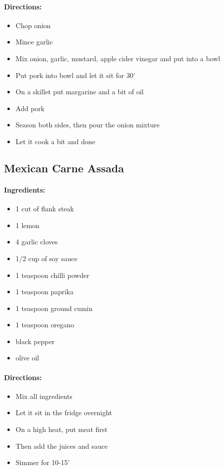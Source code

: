 \documentclass{article}
\begin{document}
\paragraph{Directions:}
\begin{itemize}
    \item Chop onion
    \item Mince garlic
    \item Mix onion, garlic, mustard, apple cider vinegar and put into a bowl
    \item Put pork into bowl and let it sit for 30'
    \item On a skillet put margarine and a bit of oil
    \item Add pork
    \item Season both sides, then pour the onion mixture
    \item Let it cook a bit and done
\end{itemize}

\subsection{Mexican Carne Assada}

\paragraph{Ingredients:}
\begin{itemize}
    \item 1 cut of flank steak
    \item 1 lemon
    \item 4 garlic cloves
    \item 1/2 cup of soy sauce
    \item 1 teaspoon chilli powder
    \item 1 teaspoon paprika
    \item 1 teaspoon ground cumin
    \item 1 teaspoon oregano
    \item black pepper
    \item olive oil
\end{itemize}

\paragraph{Directions:}
\begin{itemize}
    \item Mix all ingredients
    \item Let it sit in the fridge overnight
    \item On a high heat, put meat first
    \item Then add the juices and sauce
    \item Simmer for 10-15'
\end{itemize}
\end{document}
